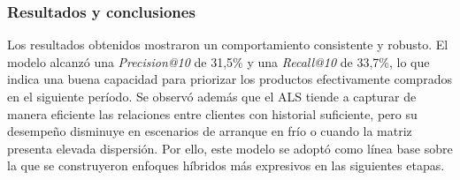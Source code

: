 

\subsubsection{Resultados y conclusiones}

Los resultados obtenidos mostraron un comportamiento consistente y robusto. El modelo alcanzó una \textit{Precision@10} de 31{,}5\% y una \textit{Recall@10} de 33{,}7\%, lo que indica una buena capacidad para priorizar los productos efectivamente comprados en el siguiente período. Se observó además que el ALS tiende a capturar de manera eficiente las relaciones entre clientes con historial suficiente, pero su desempeño disminuye en escenarios de arranque en frío o cuando la matriz presenta elevada dispersión. Por ello, este modelo se adoptó como línea base sobre la que se construyeron enfoques híbridos más expresivos en las siguientes etapas.

